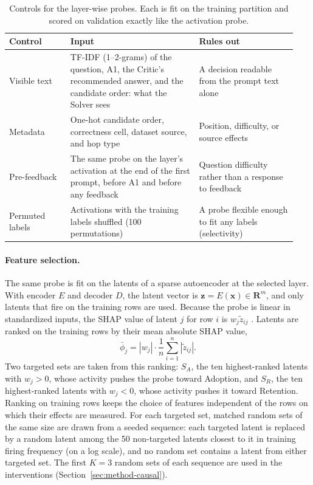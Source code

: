 \begin{table}[t]
  \centering
  \small
  \caption{Controls for the layer-wise probes. Each is fit on the training
  partition and scored on validation exactly like the activation probe.}
  \label{tab:probe-controls}
  \begin{tabular}{@{}p{0.2\linewidth}p{0.42\linewidth}p{0.32\linewidth}@{}}
    \toprule
    Control & Input & Rules out \\
    \midrule
    Visible text & TF-IDF (1--2-grams) of the question, A1, the Critic's
      recommended answer, and the candidate order: what the Solver sees
      & A decision readable from the prompt text alone \\
    Metadata & One-hot candidate order, correctness cell, dataset source,
      and hop type & Position, difficulty, or source effects \\
    Pre-feedback & The same probe on the layer's activation at the end of
      the first prompt, before A1 and before any feedback
      & Question difficulty rather than a response to feedback \\
    Permuted labels & Activations with the training labels shuffled
      (100 permutations) & A probe flexible enough to fit any labels
      (selectivity) \\
    \bottomrule
  \end{tabular}
\end{table}

\paragraph{Feature selection.} The same probe is fit on the latents of a sparse
autoencoder at the selected layer. With encoder $E$ and decoder $D$, the latent
vector is $\mathbf{z} = E(\mathbf{x}) \in \mathbf{R}^{m}$, and only latents that
fire on the training rows are used. Because the probe is linear in standardized
inputs, the SHAP value of latent $j$ for row $i$ is $w_j \tilde{z}_{ij}$
\cite{lundberg2017shap}. Latents are ranked on the training rows by their mean
absolute SHAP value,
\begin{equation}
  \bar{\phi}_j = |w_j| \cdot \frac{1}{n}\sum_{i=1}^{n} |\tilde{z}_{ij}|.
  \label{eq:shap}
\end{equation}
Two targeted sets are taken from this ranking: $S_A$, the ten highest-ranked
latents with $w_j > 0$, whose activity pushes the probe toward Adoption, and
$S_R$, the ten highest-ranked latents with $w_j < 0$, whose activity pushes it
toward Retention. Ranking on training rows keeps the choice of features
independent of the rows on which their effects are measured. For each targeted
set, matched random sets of the same size are drawn from a seeded sequence:
each targeted latent is replaced by a random latent among the 50 non-targeted
latents closest to it in training firing frequency (on a log scale), and no
random set contains a latent from either targeted set. The first $K = 3$
random sets of each sequence are used in the interventions
(Section~\ref{sec:method-causal}).

